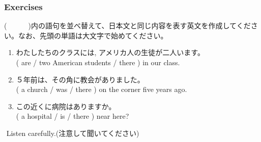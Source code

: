 \documentclass[aspectratio=169]{beamer}
\newcommand{\myaudio}[1]{\href{#1}{\faVolumeUp}}
\begin{document}
\begin{frame}[plain]\frametitle{Exercises}
(~~~~~~)内の語句を並べ替えて、日本文と同じ内容を表す英文を作成してください。なお、先頭の単語は大文字で始めてください。\pause

  \begin{enumerate}
   \item わたしたちのクラスには,
アメリカ人の生徒が二人います。\\
         \pause
         ( are / two American students / there ) in our class.\\
         \pause
         \pause
   \item ５年前は、その角に教会がありました。\\
         \pause
         ( a church / was / there ) on the corner five years ago.\\
         \pause
         \pause
   \item この近くに病院はありますか。\\
         \pause
         ( a hospital / is / there ) near here?\\
         \pause
  \end{enumerate}



\myaudio{audio/001_there_is_06.mp3}\,\,{}Listen carefully.(注意して聞いてください)


\end{frame}
\end{document}
